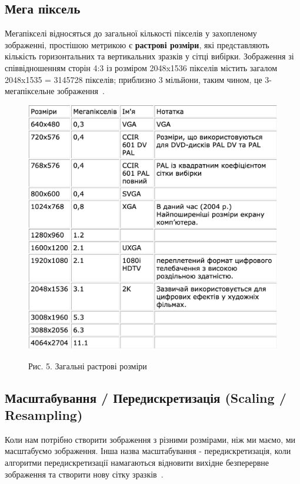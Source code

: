 \documentclass[a4paper,12pt]{article}
\begin{document}
    \subsection{Мега піксель}\label{subsec:megapixels}
    Мегапікселі відносяться до загальної кількості пікселів у захопленому зображенні, простішою метрикою є \textbf{растрові розміри}, які представляють кількість горизонтальних та вертикальних зразків у сітці вибірки.
    Зображення зі співвідношенням сторін 4:3 із розміром 2048x1536 пікселів містить загалом 2048x1535 = 3145728 пікселів;
    приблизно 3 мільйони, таким чином, це 3-мегапіксельне зображення~\cite{gimp:1}.

    \begin{figure}
        \label{fig:image5}
        \centering
        \includegraphics[scale=0.5]{image5.png}

        Рис. 5. Загальні растрові розміри
    \end{figure}

    \subsection{Масштабування / Передискретизація (Scaling / Resampling)}\label{subsec:scaling_resampling}
    Коли нам потрібно створити зображення з різними розмірами, ніж ми маємо, ми масштабуємо зображення.
    Інша назва масштабування - передискретизація, коли алгоритми передискретизації намагаються відновити вихідне безперервне зображення та створити нову сітку зразків~\cite{gimp:1}.
\end{document}
